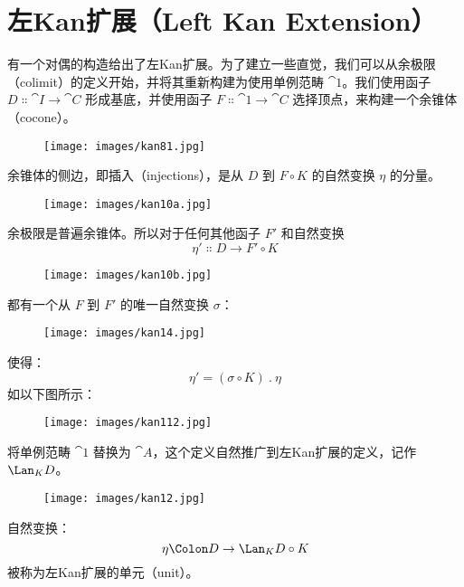 \section{左Kan扩展（Left Kan Extension）}

有一个对偶的构造给出了左Kan扩展。为了建立一些直觉，我们可以从余极限（colimit）的定义开始，并将其重新构建为使用单例范畴 $\cat{1}$。我们使用函子 $D \Colon \cat{I} \to \cat{C}$ 形成基底，并使用函子 $F \Colon \cat{1} \to \cat{C}$ 选择顶点，来构建一个余锥体（cocone）。

\begin{figure}[H]
  \centering
  \texttt{[image: images/kan81.jpg]}
\end{figure}

\noindent
余锥体的侧边，即插入（injections），是从 $D$ 到 $F \circ K$ 的自然变换 $\eta$ 的分量。

\begin{figure}[H]
  \centering
  \texttt{[image: images/kan10a.jpg]}
\end{figure}

\noindent
余极限是普遍余锥体。所以对于任何其他函子 $F'$ 和自然变换
\[\eta' \Colon D \to F' \circ K\]

\begin{figure}[H]
  \centering
  \texttt{[image: images/kan10b.jpg]}
\end{figure}

\noindent
都有一个从 $F$ 到 $F'$ 的唯一自然变换 $\sigma$：

\begin{figure}[H]
  \centering
  \texttt{[image: images/kan14.jpg]}
\end{figure}

\noindent
使得：
\[\eta' = (\sigma \circ K)\ .\ \eta\]
如以下图所示：

\begin{figure}[H]
  \centering
  \texttt{[image: images/kan112.jpg]}
\end{figure}

\noindent
将单例范畴 $\cat{1}$ 替换为 $\cat{A}$，这个定义自然推广到左Kan扩展的定义，记作 $\Lan_{K}D$。

\begin{figure}[H]
  \centering
  \texttt{[image: images/kan12.jpg]}
\end{figure}

\noindent
自然变换：
\[\eta \Colon D \to \Lan_{K}D \circ K\]
被称为左Kan扩展的单元（unit）。

